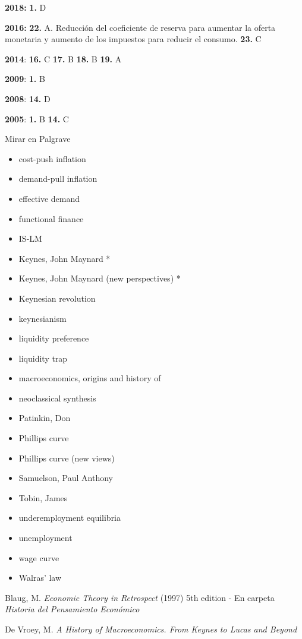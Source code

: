\documentclass{nuevotema}
\begin{document}
\notas

\textbf{2018:} \textbf{1.} D

\textbf{2016:} \textbf{22.} A. Reducción del coeficiente de reserva para aumentar la oferta monetaria y aumento de los impuestos para reducir el consumo. \textbf{23.} C

\textbf{2014}: \textbf{16.} C \textbf{17.} B \textbf{18.} B \textbf{19.} A

\textbf{2009}: \textbf{1.} B

\textbf{2008}: \textbf{14.} D

\textbf{2005}: \textbf{1.} B \textbf{14.} C

\bibliografia

Mirar en Palgrave
\begin{itemize}
	\item cost-push inflation
	\item demand-pull inflation
	\item effective demand
	\item functional finance
	\item IS-LM
	\item Keynes, John Maynard *
	\item Keynes, John Maynard (new perspectives) *
	\item Keynesian revolution
	\item keynesianism
	\item liquidity preference
	\item liquidity trap
	\item macroeconomics, origins and history of
	\item neoclassical synthesis
	\item Patinkin, Don
	\item Phillips curve
	\item Phillips curve (new views)
	\item Samuelson, Paul Anthony
	\item Tobin, James
	\item underemployment equilibria
	\item unemployment
	\item wage curve
	\item Walras' law
\end{itemize}



Blaug, M. \textit{Economic Theory in Retrospect} (1997) 5th edition - En carpeta \textit{Historia del Pensamiento Económico}

De Vroey, M. \textit{A History of Macroeconomics. From Keynes to Lucas and Beyond}
\end{document}
